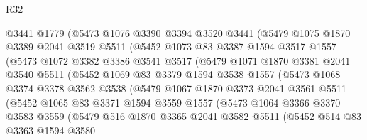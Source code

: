 \begin{lexlean}{R32}
\begin{coremodule}
              @3441
              @1779
              (@5473
                @1076
                @3390
                @3394
                @3520
                @3441
                (@5479
                  @1075
                  @1870
                  @3389
                  @2041
                  @3519
                  @5511
                  (@5452
                    @1073
                    @83
                    @3387
                    @1594
                    @3517
                    @1557
                    (@5473
                      @1072
                      @3382
                      @3386
                      @3541
                      @3517
                      (@5479
                        @1071
                        @1870
                        @3381
                        @2041
                        @3540
                        @5511
                        (@5452
                          @1069
                          @83
                          @3379
                          @1594
                          @3538
                          @1557
                          (@5473
                            @1068
                            @3374
                            @3378
                            @3562
                            @3538
                            (@5479
                              @1067
                              @1870
                              @3373
                              @2041
                              @3561
                              @5511
                              (@5452
                                @1065
                                @83
                                @3371
                                @1594
                                @3559
                                @1557
                                (@5473
                                  @1064
                                  @3366
                                  @3370
                                  @3583
                                  @3559
                                  (@5479
                                    @516
                                    @1870
                                    @3365
                                    @2041
                                    @3582
                                    @5511
                                    (@5452
                                      @514
                                      @83
                                      @3363
                                      @1594
                                      @3580

\end{coremodule}
\end{lexlean}
